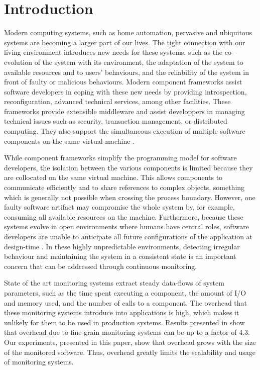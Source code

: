 \section{Introduction}\label{sec:intro}

Modern computing systems, such as home automation, pervasive and ubiquitous systems are becoming a larger part of our lives.
The tight connection with our living environment introduces new needs for these systems, such as the co-evolution of the system with its environment, the adaptation of the system to available resources and to users' behaviours, and the reliability of the system in front of faulty or malicious behaviours.
Modern component frameworks assist software developers in coping with these new needs by providing introspection, reconfiguration, advanced technical services, among other facilities.
These frameworks provide extensible middleware and assist developpers in managing technical issues such as security, transaction management, or distributed computing.
They also support the simultaneous execution of multiple software components on the same virtual machine \cite{OSGI:r5,Kevoree,bruneton06}.

While component frameworks simplify the programming model for software developers, the isolation between the various components is limited because they are collocated on the same virtual machine.
This allows components to communicate efficiently and to share references to complex objects, something which is generally not possible when crossing the process boundary.
However, one faulty software artifact may compromise the whole system by, for example, consuming all available resources on the machine.
Furthermore, because these systems evolve in open environments where humans have central roles, software developers are unable to anticipate all future configurations of the application  at design-time \cite{baresi2006toward}.
In these highly unpredictable environments, detecting irregular behaviour and maintaining the system in a consistent state is an important concern that can be addressed through continuous monitoring.

State of the art monitoring systems \cite{FrenotS04,KregerHaroldWilliamson03,Binder200645} extract steady data-flows of system parameters, such as the time spent executing a component, the amount of I/O and memory used, and the number of calls to a component.
The overhead that these monitoring systems introduce into applications is high, which makes it unlikely for them to be used in production systems.
Results presented in \cite{Binder:2009:PPV:1464245.1464249} show that overhead due to fine-grain monitoring systems can be up to a factor of 4.3.
Our experiments, presented in this paper, show that overhead grows with the size of the monitored software.
Thus, overhead greatly limits the scalability and usage of monitoring systems.

